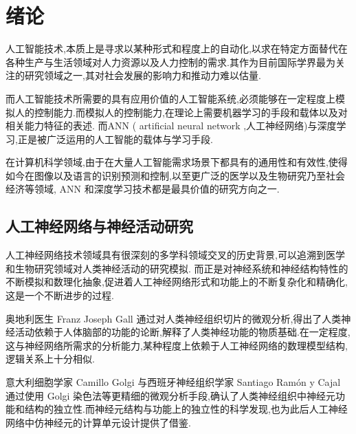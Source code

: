 

\chapter{绪论}

人工智能技术,本质上是寻求以某种形式和程度上的自动化,以求在特定方面替代在各种生产与生活领域对人力资源以及人力控制的需求.其作为目前国际学界最为关注的研究领域之一,其对社会发展的影响力和推动力难以估量.

而人工智能技术所需要的具有应用价值的人工智能系统,必须能够在一定程度上模拟人的控制能力.而模拟人的控制能力,在理论上需要机器学习的手段和载体以及对相关能力特征的表述. 而ANN ( artificial neural network ,人工神经网络)与深度学习,正是被广泛运用的人工智能的载体与学习手段.

在计算机科学领域,由于在大量人工智能需求场景下都具有的通用性和有效性,使得如今在图像以及语言的识别预测和控制\cite{yingyonglingyu},以至更广泛的医学以及生物研究乃至社会经济等领域, ANN 和深度学习技术都是最具价值的研究方向之一.


\section{人工神经网络与神经活动研究}


人工神经网络技术领域具有很深刻的多学科领域交叉的历史背景,可以追溯到医学和生物研究领域对人类神经活动的研究模拟. 而正是对神经系统和神经结构特性的不断模拟和数理化抽象,促进着人工神经网络形式和功能上的不断复杂化和精确化,这是一个不断进步的过程.

奥地利医生 Franz Joseph Gall 通过对人类神经组织切片的微观分析,得出了人类神经活动依赖于人体脑部的功能的论断,解释了人类神经功能的物质基础.在一定程度,这与神经网络所需求的分析能力,某种程度上依赖于人工神经网络的数理模型结构,逻辑关系上十分相似.

意大利细胞学家 Camillo Golgi 与西班牙神经组织学家 Santiago Ramón y Cajal 通过使用 Golgi 染色法等更精细的微观分析手段,确认了人类神经组织中神经元功能和结构的独立性.而神经元结构与功能上的独立性的科学发现,也为此后人工神经网络中仿神经元的计算单元设计提供了借鉴.

